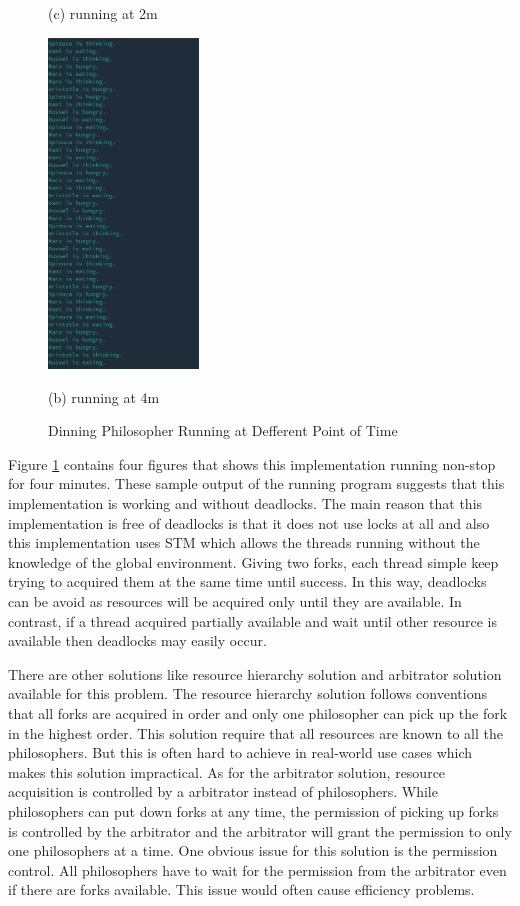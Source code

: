 \documentclass{article}
\begin{document}
\begin{normalsize}
\begin{figure}[H]
\begin{minipage}[b]{0.24\linewidth}
      \centerline{ (c) running at 2m}\medskip
    \end{minipage}
    \hfill
    \begin{minipage}[b]{0.24\linewidth}
      \centering
      \centerline{\includegraphics[width=4.0cm]{dinning4m}}
      \centerline{ (b) running at 4m}\medskip
    \end{minipage}

    \caption{Dinning Philosopher Running at Defferent Point of Time}
    \label{fig:drunning}
  \end{figure}

  Figure \ref{fig:drunning} contains four figures that shows this implementation
  running non-stop for four minutes. These sample output of the running program
  suggests that this implementation is working and without deadlocks. The main
  reason that this implementation is free of deadlocks is that it does not use
  locks at all and also this implementation uses STM which allows the threads
  running without the knowledge of the global environment. Giving two forks,
  each thread simple keep trying to acquired them at the same time until success.
  In this way, deadlocks can be avoid as resources will be acquired only until
  they are available. In contrast, if a thread acquired partially available and
  wait until other resource is available then deadlocks may easily occur.

  There are other solutions like resource hierarchy solution and arbitrator
  solution available for this problem. The resource hierarchy solution follows
  conventions that all forks are acquired in order and only one philosopher can
  pick up the fork in the highest order. This solution require that all
  resources are known to all the philosophers. But this is often hard to achieve in
  real-world use cases which makes this solution impractical. As for the
  arbitrator solution, resource acquisition is controlled by a arbitrator instead
  of philosophers. While philosophers can put down forks at any time, the
  permission of picking up forks is controlled by the arbitrator and the
  arbitrator will grant the permission to only one philosophers at a time. One
  obvious issue for this solution is the permission control. All philosophers
  have to wait for the permission from the arbitrator even if there are forks
  available. This issue would often cause efficiency problems.


\end{normalsize}
\end{document}
